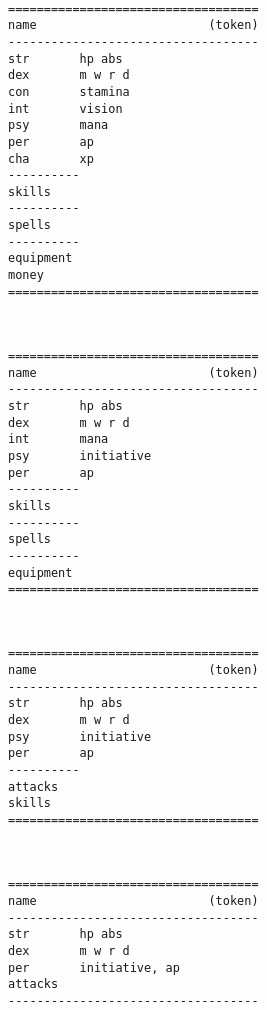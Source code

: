 
\

\raggedbottom

\goodbreak \begin{samepage} \small \begin{verbatim}
===================================
name                        (token)
-----------------------------------
str       hp abs
dex       m w r d
con       stamina
int       vision
psy       mana
per       ap
cha       xp
----------
skills
----------
spells
----------
equipment
money
===================================
\end{verbatim} \normalsize \end{samepage}

\

\goodbreak \begin{samepage} \small \begin{verbatim}
===================================
name                        (token)
-----------------------------------
str       hp abs
dex       m w r d
int       mana
psy       initiative
per       ap
----------
skills
----------
spells
----------
equipment
===================================
\end{verbatim} \normalsize \end{samepage}

\

\goodbreak \begin{samepage} \small \begin{verbatim}
===================================
name                        (token)
-----------------------------------
str       hp abs
dex       m w r d
psy       initiative
per       ap
----------
attacks
skills
===================================
\end{verbatim} \normalsize \end{samepage}

\

\goodbreak \begin{samepage} \small \begin{verbatim}
===================================
name                        (token)
-----------------------------------
str       hp abs
dex       m w r d
per       initiative, ap
attacks
-----------------------------------
\end{verbatim} \normalsize \end{samepage}

\

